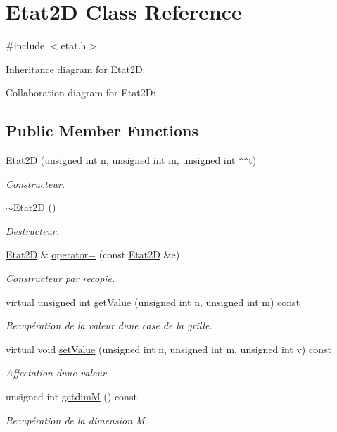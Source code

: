 \hypertarget{class_etat2_d}{}\section{Etat2D Class Reference}
\label{class_etat2_d}


{\ttfamily \#include $<$etat.\+h$>$}



Inheritance diagram for Etat2D\+:


Collaboration diagram for Etat2D\+:
\subsection*{Public Member Functions}
\begin{DoxyCompactItemize}
\item 
\mbox{\hyperlink{class_etat2_d_aaa6fd1c51ab31235f49de50817a8bbe5}{Etat2D}} (unsigned int n, unsigned int m, unsigned int $\ast$$\ast$t)
\begin{DoxyCompactList}\small\item\em Constructeur. \end{DoxyCompactList}\item 
\mbox{\hyperlink{class_etat2_d_a3eaa7f0e606a9b2f5fc634d6b571042e}{$\sim$\+Etat2D}} ()
\begin{DoxyCompactList}\small\item\em Destructeur. \end{DoxyCompactList}\item 
\mbox{\hyperlink{class_etat2_d}{Etat2D}} \& \mbox{\hyperlink{class_etat2_d_a209b78aae297b6926e1c0450e19c1a89}{operator=}} (const \mbox{\hyperlink{class_etat2_d}{Etat2D}} \&e)
\begin{DoxyCompactList}\small\item\em Constructeur par recopie. \end{DoxyCompactList}\item 
virtual unsigned int \mbox{\hyperlink{class_etat2_d_a6efc3996c7578b7fb1de71402021c389}{get\+Value}} (unsigned int n, unsigned int m) const
\begin{DoxyCompactList}\small\item\em Recupération de la valeur d\textquotesingle{}une case de la grille. \end{DoxyCompactList}\item 
virtual void \mbox{\hyperlink{class_etat2_d_ab19cb72ec4d46d96bd41038b84176797}{set\+Value}} (unsigned int n, unsigned int m, unsigned int v) const
\begin{DoxyCompactList}\small\item\em Affectation d\textquotesingle{}une valeur. \end{DoxyCompactList}\item 
unsigned int \mbox{\hyperlink{class_etat2_d_abcef6210d2c55b8fe4e33c9d29a1ac90}{getdimM}} () const
\begin{DoxyCompactList}\small\item\em Recupération de la dimension M. \end{DoxyCompactList}\end{DoxyCompactItemize}


